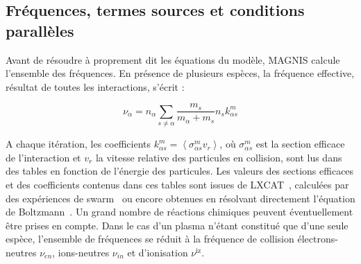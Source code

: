 \begin{refsection}
\subsection{Fréquences, termes sources et conditions parallèles}
Avant de résoudre à proprement dit les équations du modèle, MAGNIS
calcule l'ensemble des fréquences. En présence de plusieurs espèces, la
fréquence effective, résultat de toutes les interactions, s'écrit :

\begin{equation*}
\nu_{\alpha}=n_\alpha\sum_{s\neq\alpha} \frac{m_s}{m_\alpha+m_s}
n_sk^m_{\alpha s}
\end{equation*}

A chaque itération, les coefficients $k^m_{\alpha s}=\left<\sigma^m_{\alpha
s}v_r\right>$, où $\sigma^m_{\alpha
s}$ est la section efficace de l'interaction et $v_r$ la vitesse relative des
particules en collision, sont lus dans des tables en fonction de l'énergie des
particules.
Les valeurs des sections efficaces et des coefficients contenus dans ces tables
sont issues de LXCAT~\parencite{LXCAT}, calculées par des expériences de
swarm~\parencite{Phelps} ou encore obtenues en résolvant directement l'équation
de Boltzmann~\parencite{Bolsig}. Un grand
nombre de réactions chimiques peuvent éventuellement être prises en compte.
Dans le cas d'un plasma n'étant constitué que d'une seule espèce, l'ensemble
de fréquences se réduit à la fréquence de collision électrons-neutres
$\nu_{en}$, ions-neutres $\nu_{in}$ et d'ionisation $\nu^\text{iz}$.


\end{refsection}

